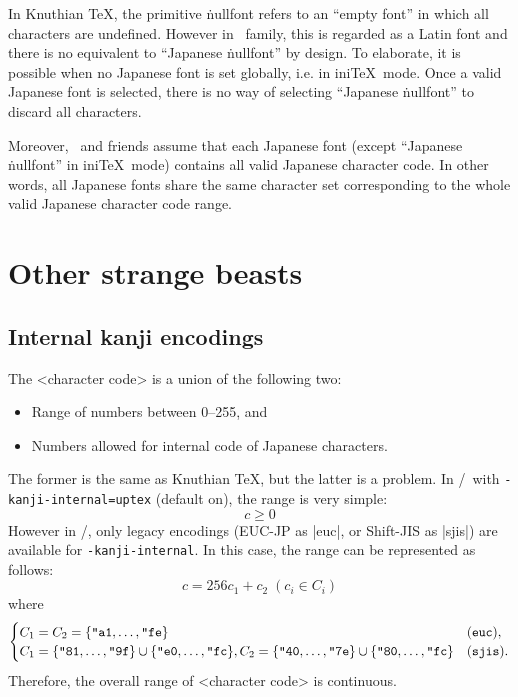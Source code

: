 \documentclass[a4paper,11pt,dvipdfmx]{article}
\let\emph=\origemph
\def\code#1{\texttt{#1}}
\begin{document}
In Knuthian \TeX, the primitive \.{nullfont} refers to an ``empty font''
in which all characters are undefined.
However in \pTeX\ family, this is regarded as a Latin font
and there is no equivalent to ``Japanese \.{nullfont}'' by design.
To elaborate, it is possible \emph{only} when no Japanese font is
set globally, i.e. in ini\TeX\ mode.
Once a valid Japanese font is selected, there is no way of
selecting ``Japanese \.{nullfont}'' to discard all characters.

Moreover, \pTeX\ and friends assume that each Japanese font
(except ``Japanese \.{nullfont}'' in ini\TeX\ mode)
contains all valid Japanese character code.
In other words, all Japanese fonts share the same character set
corresponding to the whole valid Japanese character code range.\label{jfont}

\section{Other strange beasts}


\subsection{Internal kanji encodings}\label{kanji-internal}

The <character code> is a union of the following two:
\begin{itemize}
 \item Range of numbers between 0--255, and
 \item Numbers allowed for internal code of Japanese characters.
\end{itemize}
The former is the same as Knuthian \TeX, but the latter is a problem.
In \upTeX/\eupTeX\ with \code{-kanji-internal=uptex} (default on),
the range is very simple:
\[ c \ge 0 \]
However in \pTeX/\epTeX, only legacy encodings (EUC-JP as |euc|,
or Shift-JIS as |sjis|) are available for \code{-kanji-internal}.
In this case, the range can be represented as follows:
\[
  c = 256c_1+c_2 \; (c_i\in C_i)
\]
where
\[
  \begin{cases}
    C_1=C_2=\{\hex{a1},\dots,\hex{fe}\} & (\mathtt{euc}), \\
    C_1=\{\hex{81},\dots,\hex{9f}\}\cup\{\hex{e0},\dots,\hex{fc}\},
    C_2=\{\hex{40},\dots,\hex{7e}\}\cup\{\hex{80},\dots,\hex{fc}\} & (\mathtt{sjis}).
  \end{cases}
\]
Therefore, the overall range of <character code> is \emph{not} continuous.
\end{document}
